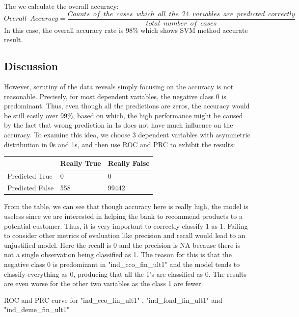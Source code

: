 \documentclass{article}
\begin{document}
\begin{spacing}{1}
\begin{large}
The we calculate the overall accuracy:
$$Overall\enspace Accuracy = \frac{Counts\enspace of\enspace the\enspace cases\enspace which\enspace all\enspace the\enspace 24\enspace variables\enspace are\enspace predicted\enspace correctly}{total\enspace number\enspace of\enspace cases}$$
In this case, the overall accuracy rate is 98\% which shows SVM method accurate result.

\subsection{Discussion}

However, scrutiny of the data reveals simply focusing on the accuracy is not reasonable. Precisely, for most dependent variables, the negative class 0 is predominant. Thus, even though all the predictions are zeros, the accuracy would be still easily over 99\%, based on which, the high performance might be caused by the fact that wrong prediction in 1s does not have much influence on the accuracy. To examine this idea, we choose 3 dependent variables with asymmetric distribution in 0s and 1s, and then use ROC and PRC to exhibit the results:

\vspace{5mm}
\begin{tabular}{| l | l | l |}
	\hline
	& Really True & Really False \\ \hline
	Predicted True & 0 & 0 \\ \hline
	Predicted False & 558 & 99442\\
	\hline
\end{tabular}
\vspace{5mm}

From the table, we can see that though accuracy here is really high, the model is  useless since we are  interested in helping the bank to recommend products to a potential customer. Thus, it is very important to correctly classify 1 as 1. Failing to consider other metrics of evaluation like precision and recall would lead to an unjustified model. Here the recall is 0 and the precision is NA because there is not a single observation being classified as 1. The reason for this is that the negative class 0 is predominant in "ind\_cco\_fin\_ult1" and the model tends to classify everything as 0, producing that all the 1’s are classified as 0. The results are even worse for the other two variables as the class 1 are fewer.

ROC and PRC curve for "ind\_cco\_fin\_ult1" , "ind\_fond\_fin\_ult1" and "ind\_deme\_fin\_ult1"


\end{large}
\end{spacing}
\end{document}
